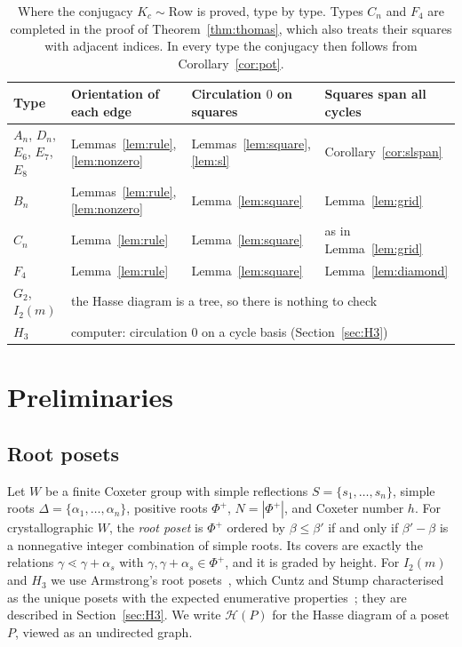\documentclass[11pt]{amsart}
\theoremstyle{definition}
\newcommand{\Row}{\mathrm{Row}}
\newcommand{\Hasse}{\mathcal H}
\begin{document}
\begin{table}[h]\centering\small
\renewcommand{\arraystretch}{1.15}
\begin{tabular}{llll}
Type & Orientation of each edge & Circulation $0$ on squares & Squares span all cycles\\\hline
$A_n$, $D_n$, $E_6$, $E_7$, $E_8$ & Lemmas~\ref{lem:rule}, \ref{lem:nonzero} & Lemmas~\ref{lem:square}, \ref{lem:sl} & Corollary~\ref{cor:slspan}\\
$B_n$ & Lemmas~\ref{lem:rule}, \ref{lem:nonzero} & Lemma~\ref{lem:square} & Lemma~\ref{lem:grid}\\
$C_n$ & Lemma~\ref{lem:rule} & Lemma~\ref{lem:square} & as in Lemma~\ref{lem:grid}\\
$F_4$ & Lemma~\ref{lem:rule} & Lemma~\ref{lem:square} & Lemma~\ref{lem:diamond}\\
$G_2$, $I_2(m)$ & \multicolumn{3}{l}{the Hasse diagram is a tree, so there is nothing to check}\\
$H_3$ & \multicolumn{3}{l}{computer: circulation $0$ on a cycle basis (Section~\ref{sec:H3})}\\
\end{tabular}
\caption{Where the conjugacy $K_c\sim\Row$ is proved, type by type. Types $C_n$ and $F_4$ are completed in the proof of Theorem~\ref{thm:thomas}, which also treats their squares with adjacent indices. In every type the conjugacy then follows from Corollary~\ref{cor:pot}.}\label{tab:outline}
\end{table}

\section{Preliminaries}\label{sec:prelim}

\subsection{Root posets}
Let $W$ be a finite Coxeter group with simple reflections $S=\{s_1,\dots,s_n\}$, simple roots $\Delta=\{\alpha_1,\dots,\alpha_n\}$, positive roots $\Phi^+$, $N=|\Phi^+|$, and Coxeter number $h$. For crystallographic $W$, the \emph{root poset} is $\Phi^+$ ordered by $\beta\le\beta'$ if and only if $\beta'-\beta$ is a nonnegative integer combination of simple roots. Its covers are exactly the relations $\gamma\lessdot\gamma+\alpha_s$ with $\gamma,\gamma+\alpha_s\in\Phi^+$, and it is graded by height. For $I_2(m)$ and $H_3$ we use Armstrong's root posets~\cite{Arm}, which Cuntz and Stump characterised as the unique posets with the expected enumerative properties~\cite{CS}; they are described in Section~\ref{sec:H3}. We write $\Hasse(P)$ for the Hasse diagram of a poset $P$, viewed as an undirected graph.
\end{document}
